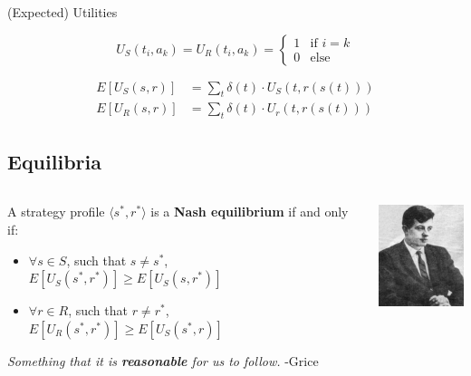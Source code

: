 \documentclass[compress]{beamer}
\begin{document}
\begin{frame}{(Expected) Utilities}
\begin{block}{}
\begin{equation}
 U_{S}(t_i, a_k) = U_{R}(t_i, a_k) =
\left\{
	\begin{array}{ll}
		1  & \mbox{if } i = k \\
		0 & \mbox{else}
	\end{array}
\right.
\end{equation}\end{block}
\begin{block}{}
	\begin{equation}
	    \begin{split}
	      E[U_{S}(s,r)] &= \sum_{t} \delta (t) \cdot U_S(t, r(s(t)))\\
	      E[U_{R}(s,r)] &= \sum_{t} \delta (t) \cdot U_r(t, r(s(t)))
	    \end{split}
	\end{equation}
\end{block}
\end{frame}



\subsection{Equilibria}

\begin{frame}{\cite{nash:1951}}
\begin{columns}[T]  
   \begin{column}{.75\textwidth}
      \begin{block}{}
 A strategy profile $\langle s^*, r^*\rangle$ is a \textbf{Nash equilibrium}
if and only if:
  \begin{itemize}
   \item $\forall s \in S$, such that $s \neq s^*$, $E[U_S(s^*,r^*)] \geq
E[U_S(s,r^*)]$
  \item $\forall r \in R$, such that $r \neq r^*$, $E[U_R(s^*,r^*)] \geq
E[U_S(s^*,r)]$
  \end{itemize}
      \end{block}
      \begin{block}{}
           \emph{Something that it is \textbf{reasonable} for us to follow.} -Grice
      \end{block}

    \end{column}
    \begin{column}{.2\textwidth}
	  \vspace{12pt}
	  \includegraphics[height=1.2in]{nash.jpg}   
     \end{column}
  \end{columns}
\end{frame}
\end{document}
